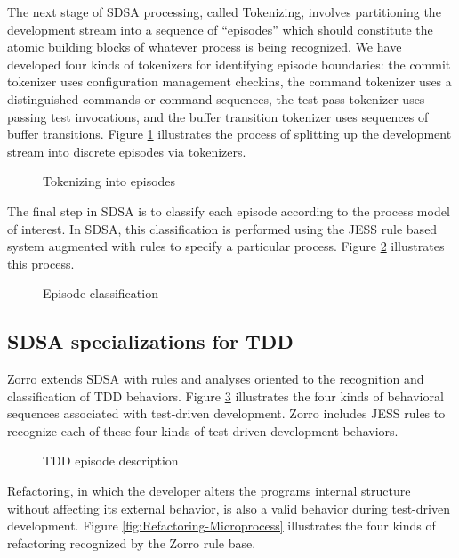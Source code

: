 \documentclass[runningheads]{llncs}
\begin{document}
The next stage of SDSA processing, called Tokenizing, involves partitioning the
development stream into a sequence of ``episodes'' which should constitute
the atomic building blocks of whatever process is being recognized.  We
have developed four kinds of tokenizers for identifying episode boundaries:
the commit tokenizer uses configuration management checkins, the command
tokenizer uses a distinguished commands or command sequences, the test pass
tokenizer uses passing test invocations, and the buffer transition
tokenizer uses sequences of buffer transitions.  Figure
\ref{fig:TokenizerChain} illustrates the process of splitting up the
development stream into discrete episodes via tokenizers.

\begin{figure}[ht]
  \centering
  \caption{Tokenizing into episodes}
  \label{fig:TokenizerChain}
\end{figure} 

The final step in SDSA is to classify each episode according to the process
model of interest. In SDSA, this classification is performed using the JESS
rule based system augmented with rules to specify a particular
process. Figure \ref{fig:Classification} illustrates this process.

\begin{figure}[ht] 
  \centering
  \caption{Episode classification}
  \label{fig:Classification}
\end{figure} 

\subsection{SDSA specializations for TDD}

Zorro extends SDSA with rules and analyses oriented to the recognition and
classification of TDD behaviors. 
Figure \ref{fig:TDD-Microprocess} illustrates the four kinds of 
behavioral sequences associated with test-driven development. Zorro includes JESS rules
to recognize each of these four kinds of test-driven development behaviors.

\begin{figure}[ht] 
  \centering
  \caption{TDD episode description}
  \label{fig:TDD-Microprocess}
\end{figure} 

Refactoring, in which the developer alters the programs internal structure without affecting
its external behavior, is also a valid behavior during test-driven development.  Figure
\ref{fig:Refactoring-Microprocess} illustrates the four kinds of refactoring recognized by 
the Zorro rule base. 
\end{document}
